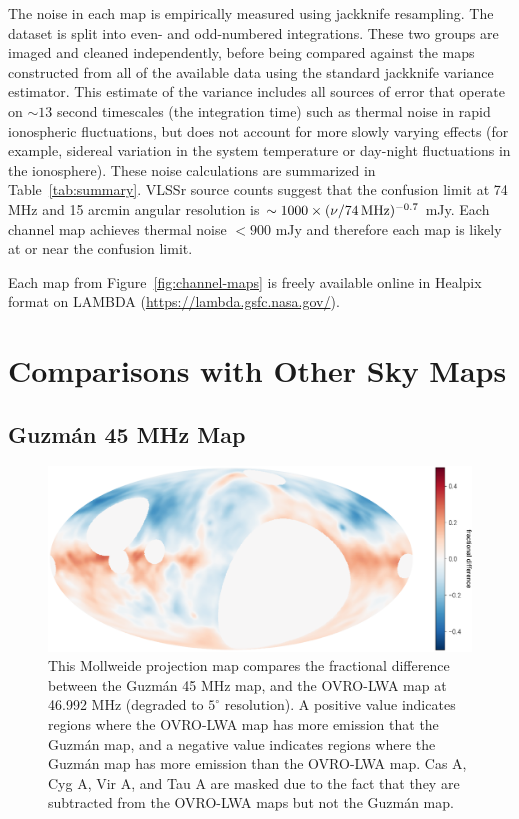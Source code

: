 \documentclass[twocolumn]{aastex61}
\begin{document}
The noise in each map is empirically measured using jackknife resampling. The dataset is split into
even- and odd-numbered integrations. These two groups are imaged and cleaned independently, before
being compared against the maps constructed from all of the available data using the standard
jackknife variance estimator. This estimate of the variance includes all sources of error that
operate on $\sim13$ second timescales (the integration time) such as thermal noise in rapid
ionospheric fluctuations, but does not account for more slowly varying effects (for example,
sidereal variation in the system temperature or day-night fluctuations in the ionosphere). These
noise calculations are summarized in Table~\ref{tab:summary}.  VLSSr source counts
\citep{2014MNRAS.440..327L} suggest that the confusion limit at 74 MHz and 15 arcmin angular
resolution is $\sim 1000\times(\nu/74\,{\rm MHz})^{-0.7}$ mJy.  Each channel map achieves thermal
noise $<900$ mJy and therefore each map is likely at or near the confusion limit.

Each map from Figure~\ref{fig:channel-maps} is freely available online in Healpix format
\citep{2005ApJ...622..759G} on LAMBDA (\url{https://lambda.gsfc.nasa.gov/}).

\section{Comparisons with Other Sky Maps}\label{sec:compare}

\subsection{Guzm\'{a}n 45 MHz Map}

\begin{figure}[t]
    \centering
    \includegraphics[height=0.32\textheight]{figures/guzman/guzman}
    \caption{
        This Mollweide projection map compares the fractional difference between the Guzm\'{a}n 45
        MHz map, and the OVRO-LWA map at 46.992 MHz (degraded to $5^\circ$ resolution). A positive
        value indicates regions where the OVRO-LWA map has more emission that the Guzm\'{a}n map,
        and a negative value indicates regions where the Guzm\'{a}n map has more emission than the
        OVRO-LWA map. Cas A, Cyg A, Vir A, and Tau A are masked due to the fact that they are
        subtracted from the OVRO-LWA maps but not the Guzm\'{a}n map.
    }
    \label{fig:guzman-comparison}
\end{figure}
\end{document}
